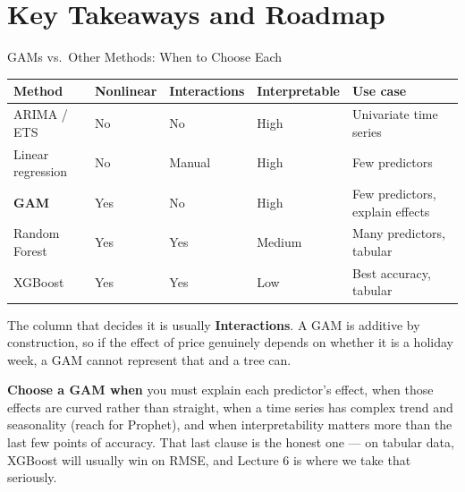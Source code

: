 \documentclass[aspectratio=169, 11pt]{beamer}
\begin{document}
\section{Key Takeaways and Roadmap}


\begin{frame}{GAMs vs.\ Other Methods: When to Choose Each}
  \begin{center}
    {\small
    \begin{tabular}{lllll}
      \toprule
      \textbf{Method} & \textbf{Nonlinear} & \textbf{Interactions} & \textbf{Interpretable} & \textbf{Use case} \\
      \midrule
      ARIMA / ETS       & No  & No     & High   & Univariate time series \\
      Linear regression & No  & Manual & High   & Few predictors \\
      \textbf{GAM}      & Yes & No     & High   & Few predictors, explain effects \\
      Random Forest     & Yes & Yes    & Medium & Many predictors, tabular \\
      XGBoost           & Yes & Yes    & Low    & Best accuracy, tabular \\
      \bottomrule
    \end{tabular}
    }
  \end{center}

  \vspace{0.15cm}
  The column that decides it is usually \textbf{Interactions}. A GAM is additive by
  construction, so if the effect of price genuinely depends on whether it is a holiday week,
  a GAM cannot represent that and a tree can.

  \vspace{0.15cm}
  \textbf{Choose a GAM when} you must explain each predictor's effect, when those effects
  are curved rather than straight, when a time series has complex trend and seasonality
  (reach for Prophet), and when interpretability matters more than the last few points of
  accuracy. That last clause is the honest one --- on tabular data, XGBoost will usually
  win on RMSE, and Lecture 6 is where we take that seriously.
\end{frame}
\end{document}
